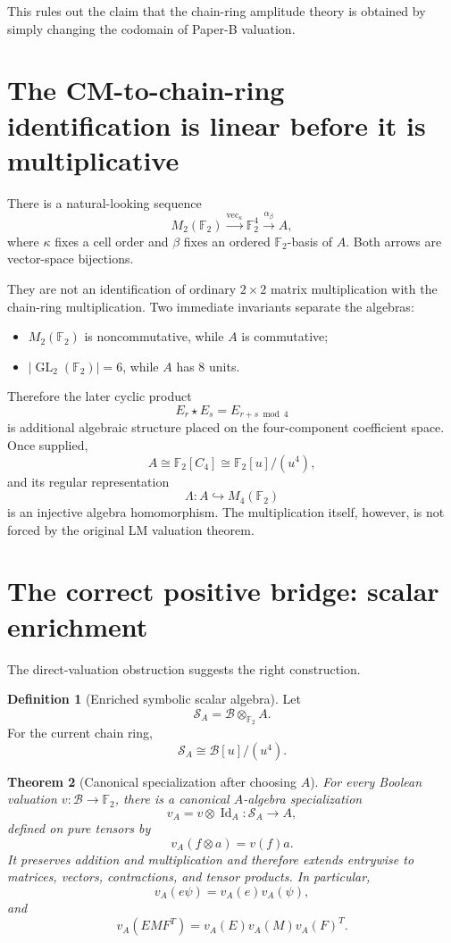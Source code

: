 \documentclass[11pt]{article}
\newtheorem{theorem}{Theorem}[section]
\theoremstyle{definition}
\newtheorem{definition}[theorem]{Definition}
\newcommand{\F}{\mathbb{F}}
\newcommand{\B}{\mathcal{B}}
\newcommand{\Sring}{\mathcal{S}_A}
\newcommand{\GL}{\operatorname{GL}}
\newcommand{\Id}{\operatorname{Id}}
\newcommand{\vecop}{\operatorname{vec}}
\begin{document}
This rules out the claim that the chain-ring amplitude theory is obtained by simply changing the
codomain of Paper-B valuation.

\section{The CM-to-chain-ring identification is linear before it is multiplicative}

There is a natural-looking sequence
\[
M_2(\F_2)
\xrightarrow{\vecop_{\kappa}}
\F_2^4
\xrightarrow{\alpha_{\beta}}
A,
\]
where \(\kappa\) fixes a cell order and \(\beta\) fixes an ordered \(\F_2\)-basis of \(A\).
Both arrows are vector-space bijections.

They are not an identification of ordinary \(2\times2\) matrix multiplication with the chain-ring
multiplication. Two immediate invariants separate the algebras:
\begin{itemize}
\item \(M_2(\F_2)\) is noncommutative, while \(A\) is commutative;
\item \(|\GL_2(\F_2)|=6\), while \(A\) has 8 units.
\end{itemize}

Therefore the later cyclic product
\[
E_r\star E_s=E_{r+s\bmod4}
\]
is additional algebraic structure placed on the four-component coefficient space. Once supplied,
\[
A\cong\F_2[C_4]\cong\F_2[u]/(u^4),
\]
and its regular representation
\[
\Lambda:A\hookrightarrow M_4(\F_2)
\]
is an injective algebra homomorphism. The multiplication itself, however, is not forced by the
original LM valuation theorem.

\section{The correct positive bridge: scalar enrichment}

The direct-valuation obstruction suggests the right construction.

\begin{definition}[Enriched symbolic scalar algebra]
Let
\[
\Sring=\B\otimes_{\F_2}A.
\]
For the current chain ring,
\[
\Sring\cong \B[u]/(u^4).
\]
\end{definition}

\begin{theorem}[Canonical specialization after choosing \(A\)]
For every Boolean valuation \(v:\B\to\F_2\), there is a canonical \(A\)-algebra specialization
\[
v_A=v\otimes\Id_A:\Sring\to A,
\]
defined on pure tensors by
\[
v_A(f\otimes a)=v(f)a.
\]
It preserves addition and multiplication and therefore extends entrywise to matrices, vectors,
contractions, and tensor products. In particular,
\[
v_A(e\psi)=v_A(e)v_A(\psi),
\]
and
\[
v_A(E M F^T)=v_A(E)v_A(M)v_A(F)^T.
\]
\end{theorem}
\end{document}
